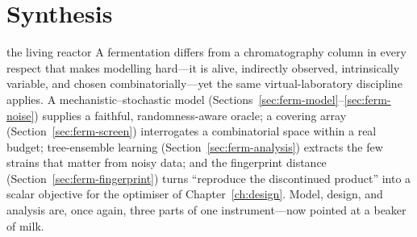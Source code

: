 \section{Synthesis}
\label{sec:ferm-synth}

\begin{keybox}{the living reactor}
A fermentation differs from a chromatography column in every respect that makes
modelling hard---it is alive, indirectly observed, intrinsically variable, and
chosen combinatorially---yet the same virtual-laboratory discipline applies. A
mechanistic--stochastic model (Sections~\ref{sec:ferm-model}--\ref{sec:ferm-noise})
supplies a faithful, randomness-aware oracle; a covering array
(Section~\ref{sec:ferm-screen}) interrogates a combinatorial space within a real
budget; tree-ensemble learning (Section~\ref{sec:ferm-analysis}) extracts the few
strains that matter from noisy data; and the fingerprint distance
(Section~\ref{sec:ferm-fingerprint}) turns ``reproduce the discontinued product''
into a scalar objective for the optimiser of Chapter~\ref{ch:design}. Model,
design, and analysis are, once again, three parts of one instrument---now pointed
at a beaker of milk.
\end{keybox}
